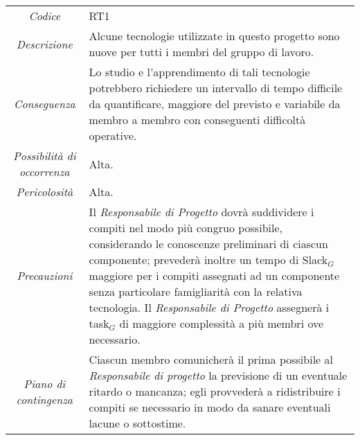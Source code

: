 \def\tabularxcolumn#1{m{#1}}
{

	\begin{center}
		\renewcommand{\arraystretch}{1.4}
		\begin{tabularx}{\textwidth}{|c|X|}
			\hline
			\rowcolor{airforceblue}
			\multicolumn{2}{|c|}{\textit{Inesperienza tecnologica}}\\
			\hline
			\textit{Codice} & RT1 \\
			\hline
			\textit{Descrizione} & Alcune tecnologie utilizzate in questo progetto sono nuove per tutti i membri del gruppo di lavoro. \\
			\hline
			\textit{Conseguenza} & Lo studio e l'apprendimento di tali tecnologie potrebbero richiedere un intervallo di tempo difficile da quantificare, maggiore del previsto e variabile da membro a membro con conseguenti difficoltà operative. \\
			\hline
			\textit{Possibilità di occorrenza} & Alta. \\
			\hline
			\textit{Pericolosità} & Alta. \\
			\hline
			\textit{Precauzioni} & Il \textit{Responsabile di Progetto} dovrà suddividere i compiti nel modo più congruo possibile, considerando le conoscenze preliminari di ciascun componente; prevederà inoltre un tempo di Slack$_G$ maggiore per i compiti assegnati ad un componente senza particolare famigliarità con la relativa tecnologia. Il \textit{Responsabile di Progetto} assegnerà i task$_G$ di maggiore complessità a più membri ove necessario.  \\
			\hline
			\textit{Piano di contingenza} & Ciascun membro comunicherà il prima possibile al \textit{Responsabile di progetto} la previsione di un eventuale ritardo o mancanza; egli provvederà a ridistribuire i compiti se necessario in modo da sanare eventuali lacune o sottostime. \\
			\hline
		\end{tabularx}
	\end{center}


\def\tabularxcolumn#1{m{#1}}
{

}}
